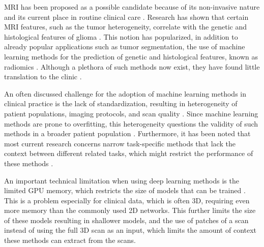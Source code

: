 \Gls{MRI} has been proposed as a possible candidate because of its non-invasive nature and its current place in routine clinical care \autocite{chaddad2019radiomicsglioblastoma}.
Research has shown that certain \gls{MRI} features, such as the tumor heterogeneity, correlate with the genetic and histological features of glioma \autocite{smits2016imaging, delfanti2017imagingcorrelates}.
This notion has popularized, in addition to already popular applications such as tumor segmentation, the use of machine learning methods for the prediction of genetic and histological features, known as radiomics \autocite{gore2020review, aerts2014radiomics, chichate2020review}.
Although a plethora of such methods now exist, they have found little translation to the clinic \autocite{gore2020review}.

An often discussed challenge for the adoption of machine learning methods in clinical practice is the lack of standardization, resulting in heterogeneity of patient populations, imaging protocols, and scan quality \autocite{gillies2016radiomics, thrall2018AIradiology}.
Since machine learning methods are prone to overfitting, this heterogeneity questions the validity of such methods in a broader patient population \autocite{thrall2018AIradiology}.
Furthermore, it has been noted that most current research concerns narrow task-specific methods that lack the context between different related tasks, which might restrict the performance of these methods \autocite{hosny2018AI}.

An important technical limitation when using deep learning methods is the limited GPU memory, which restricts the size of models that can be trained \autocite{kopuklu2019cnn}.
This is a problem especially for clinical data, which is often 3D, requiring even more memory than the commonly used 2D networks.
This further limits the size of these models resulting in shallower models, and the use of patches of a scan instead of using the full 3D scan as an input, which limits the amount of context these methods can extract from the scans.

